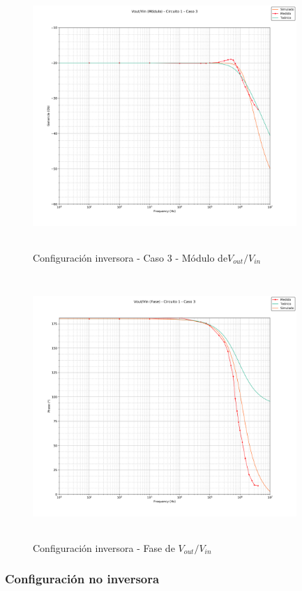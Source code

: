 \begin{figure}[H] %
	\centering
	\includegraphics[width=10cm,height=10cm,keepaspectratio]{../EJ1/00GRAFICOS/c1c3/c1c3voviMod.png}
	\caption{Configuración inversora - Caso 3 - M\'odulo de$V_{out}/V_{in}$}	
	\label{c1c3voviM}
\end{figure}

\begin{figure}[H] %
	\centering
	\includegraphics[width=10cm,height=10cm,keepaspectratio]{../EJ1/00GRAFICOS/c1c3/c1c3voviFASE.png}
	\caption{Configuración inversora - Fase de $V_{out}/V_{in}$}
	\label{c1c3voviP}
\end{figure}

\subsubsection*{Configuraci\'on no inversora}

